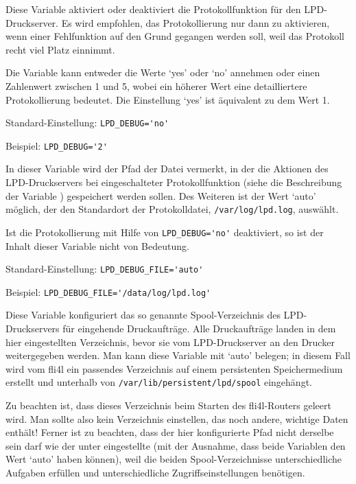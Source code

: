 \begin{description}


    Diese Variable aktiviert oder deaktiviert die Protokollfunktion für den
    LPD-Druckserver. Es wird empfohlen, das Protokollierung nur dann zu
    aktivieren, wenn einer Fehlfunktion auf den Grund gegangen werden soll,
    weil das Protokoll recht viel Platz einnimmt.

    Die Variable kann entweder die Werte `yes' oder `no' annehmen oder einen
    Zahlenwert zwischen 1 und 5, wobei ein höherer Wert eine detailliertere
    Protokollierung bedeutet. Die Einstellung `yes' ist äquivalent zu dem Wert
    1.

    Standard-Einstellung: \verb+LPD_DEBUG='no'+

    Beispiel: \verb+LPD_DEBUG='2'+


    In dieser Variable wird der Pfad der Datei vermerkt, in der die Aktionen
    des LPD-Druckservers bei eingeschalteter Protokollfunktion (siehe die
    Beschreibung der Variable ) gespeichert
    werden sollen. Des Weiteren ist der Wert `auto' möglich, der den
    Standardort der Protokolldatei, \texttt{/var/log/lpd.log}, auswählt.

    Ist die Protokollierung mit Hilfe von \verb+LPD_DEBUG='no'+ deaktiviert,
    so ist der Inhalt dieser Variable nicht von Bedeutung.

    Standard-Einstellung: \verb+LPD_DEBUG_FILE='auto'+

    Beispiel: \verb+LPD_DEBUG_FILE='/data/log/lpd.log'+


    Diese Variable konfiguriert das so genannte Spool-Verzeichnis des
    LPD-Druckservers für eingehende Druckaufträge. Alle Druckaufträge landen
    in dem hier eingestellten Verzeichnis, bevor sie vom LPD-Druckserver an den
    Drucker weitergegeben werden. Man kann diese Variable mit `auto' belegen;
    in diesem Fall wird vom fli4l ein passendes Verzeichnis auf einem
    persistenten Speichermedium erstellt und unterhalb von
    \texttt{/var/lib/persistent/lpd/spool} eingehängt.

    Zu beachten ist, dass dieses Verzeichnis beim Starten des fli4l-Routers
    geleert wird. Man sollte also kein Verzeichnis einstellen, das noch andere,
    wichtige Daten enthält! Ferner ist zu beachten, dass der hier konfigurierte
    Pfad nicht derselbe sein darf wie der unter 
    eingestellte (mit der Ausnahme, dass beide Variablen den Wert `auto' haben
    können), weil die beiden Spool-Verzeichnisse unterschiedliche Aufgaben
    erfüllen und unterschiedliche Zugriffseinstellungen benötigen.


\end{description}
